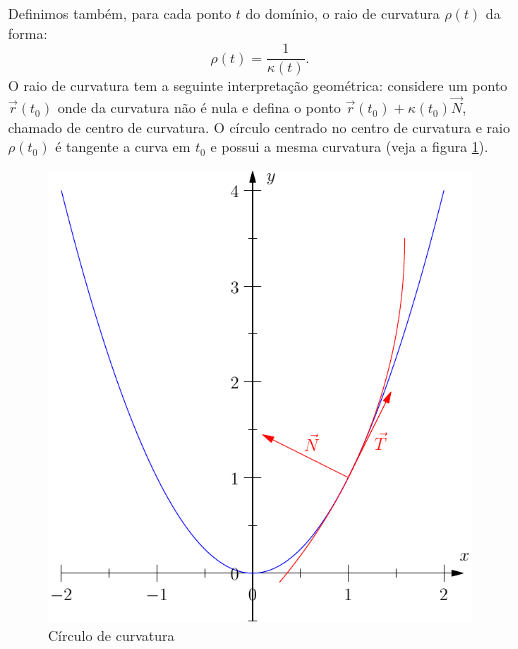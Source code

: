 Definimos também, para cada ponto $t$ do domínio, o raio de curvatura $\rho(t)$ da forma:
$$
\rho(t)=\frac{1}{\kappa(t)}.
$$
O raio de curvatura tem a seguinte interpretação geométrica: considere um ponto $\vec{r}(t_0)$ onde da curvatura não é nula e defina o ponto $\vec{r}(t_0)+\kappa(t_0)\vec{N}$, chamado de centro de curvatura. O círculo centrado no centro de curvatura e raio $\rho(t_0)$ é tangente a curva em $t_0$ e possui a mesma curvatura (veja a figura \ref{raio_de_curvatura}).


\begin{figure}
\begin{center}
    \includegraphics{./cap_curvas/figs/circulo_curvatura_parabola}
 \caption{Círculo de curvatura}\label{raio_de_curvatura}
  \end{center}
\end{figure}

